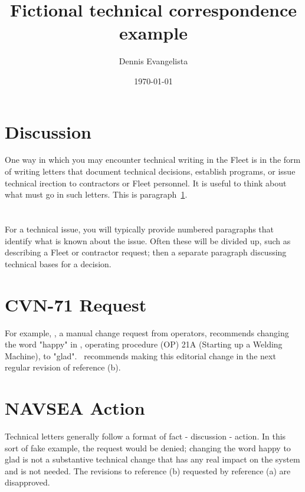 \documentclass[12pt,courier]{navyletter}
\author{Dennis Evangelista}
\title{Fictional technical correspondence example}
\date{\today}
\begin{document}
\makedateblock{}

\begin{navyletterheader}
\navyskip{}%
\navysubjline{}%
\navyskip{}%
\end{navyletterheader}

\section{Discussion}\label{test} 
One way in which you may encounter technical writing in the Fleet is in the form of writing letters that document technical decisions, establish programs, or issue technical irection to contractors or Fleet personnel.  It is useful to think about what must go in such letters. This is paragraph~\ref{test}.

\section{} 
For a technical issue, you will typically provide numbered paragraphs that identify what is known about the issue. Often these will be divided up, such as describing a Fleet or contractor request; then a separate paragraph discussing technical bases for a decision. 

\section{CVN-71 Request}  
For example, , a manual change request from operators, recommends changing the word "happy" in , operating procedure (OP) 21A (Starting up a Welding Machine), to "glad".  \ recommends making this editorial change in the next regular revision of reference (b). 

\section{NAVSEA Action}  Technical letters generally follow a format of fact - discussion - action.  In this sort of fake example, the request would be denied; changing the word happy to glad is not a substantive technical change that has any real impact on the system and is not needed.  The revisions to reference (b) requested by reference (a) are disapproved. 
\end{document}
